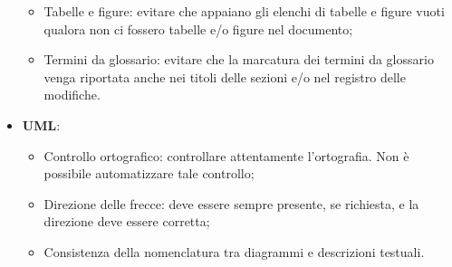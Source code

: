\begin{itemize}
\begin{itemize}
	\item Tabelle e figure: evitare che appaiano gli elenchi di tabelle e figure vuoti qualora non ci fossero tabelle e/o figure nel documento;
	\item Termini da glossario: evitare che la marcatura dei termini da glossario venga riportata anche nei titoli delle sezioni e/o nel registro delle modifiche.
	\end{itemize}
\item \textbf{UML}:
	\begin{itemize}
	\item Controllo ortografico: controllare attentamente l'ortografia. Non è possibile automatizzare tale controllo;
	\item Direzione delle frecce: deve essere sempre presente, se richiesta, e la direzione deve essere corretta;
	\item Consistenza della nomenclatura tra diagrammi e descrizioni testuali.
	\end{itemize}
\end{itemize}

